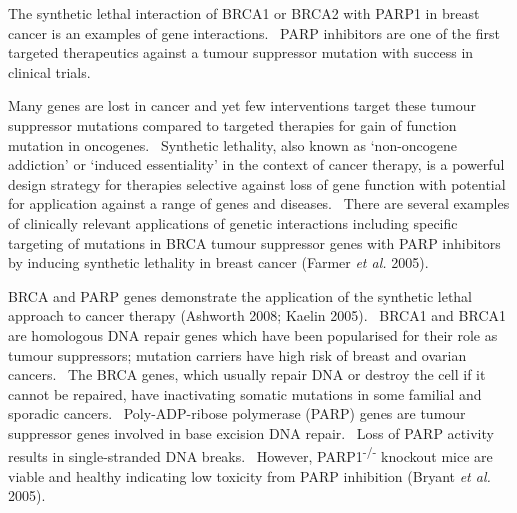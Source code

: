 


The synthetic lethal interaction of BRCA1 or BRCA2 with PARP1 in breast cancer is an examples of gene interactions. \ PARP inhibitors are one of the first targeted therapeutics against a tumour suppressor mutation with success in clinical trials. 

Many genes are lost in cancer and yet few interventions target these tumour suppressor mutations compared to targeted therapies for gain of function mutation in oncogenes. \ Synthetic lethality, also known as {\textquoteleft}non-oncogene addiction{\textquoteright} or {\textquoteleft}induced essentiality{\textquoteright} in the context of cancer therapy, is a powerful design strategy for therapies selective against loss of gene function with potential for application against a range of genes and diseases. \ There are several examples of clinically relevant applications of genetic interactions including specific targeting of mutations in BRCA tumour suppressor genes with PARP inhibitors by inducing synthetic lethality in breast cancer (Farmer\textit{ et al.} 2005). 

BRCA and PARP genes demonstrate the application of the synthetic lethal approach to cancer therapy (Ashworth 2008; Kaelin 2005). \ BRCA1 and BRCA1 are homologous DNA repair genes which have been popularised for their role as tumour suppressors; mutation carriers have high risk of breast and ovarian cancers. \ The BRCA genes, which usually repair DNA or destroy the cell if it cannot be repaired, have inactivating somatic mutations in some familial and sporadic cancers. \ Poly-ADP-ribose polymerase (PARP) genes are tumour suppressor genes involved in base excision DNA repair. \ Loss of PARP activity results in single-stranded DNA breaks. \ However, PARP1\textsuperscript{{}-/-}\textsubscript{ }knockout mice are viable and healthy indicating low toxicity from PARP inhibition (Bryant\textit{ et al.} 2005). \  

